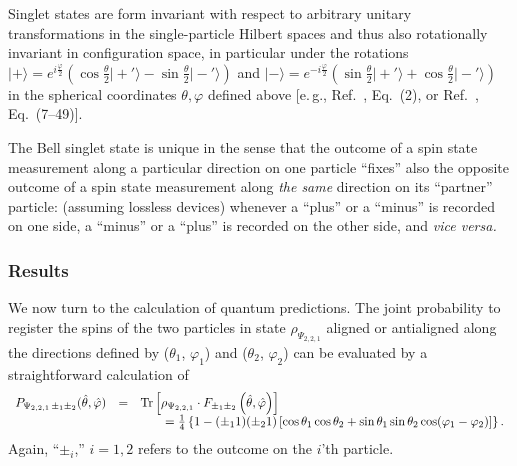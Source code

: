 \documentclass[fleqn,twoside]{article}      %
\begin{document}
Singlet states are form invariant with respect to arbitrary unitary
transformations in the single-particle Hilbert spaces and thus
also rotationally invariant in configuration space,
in particular under the rotations
$
\vert + \rangle =
e^{ i{\frac{\varphi}{2}} }
\left(
\cos \frac{\theta}{2} \vert +'  \rangle
-
\sin \frac{\theta}{2} \vert -'   \rangle
\right)
$
and
$
\vert - \rangle =
e^{ -i{\frac{\varphi}{2}} }
\left(
\sin \frac{\theta}{2} \vert +'   \rangle
+
\cos \frac{\theta}{2} \vert -'  \rangle
\right)
$
in the spherical coordinates $\theta , \varphi$ defined above
[e.\,g., Ref.~\cite{krenn1}, Eq.~(2), or Ref.~\cite{ba-89}, Eq.~(7--49)].

The Bell singlet state is unique in the sense that the outcome of a spin state measurement
along a particular direction on one particle ``fixes'' also the opposite outcome of a spin state measurement
along {\em the same} direction on its ``partner'' particle: (assuming lossless devices)
whenever a ``plus'' or a ``minus'' is recorded on one side,
a ``minus'' or a ``plus'' is recorded on the other side, and {\it vice versa.}




\subsubsection*{Results}

We now turn to the calculation of quantum predictions.
The joint probability to register the spins of the two particles
in state $\rho_{\Psi_{2,2,1}}$
aligned or antialigned along the directions defined by
($\theta_1$, $\varphi_1 $) and
($\theta_2$, $\varphi_2 $)
can be evaluated by a straightforward calculation of
\begin{equation}
\begin{array}{rcl}
P_{{ \Psi_{2,2,1}}\,\pm_1 \pm_2 } ({\hat \theta},{\hat \varphi} )&=&
{\rm Tr}\left[\rho_{ \Psi_{2,2,1}} \cdot F_{\pm_1 \pm_2 } \left({\hat \theta},{\hat \varphi} \right)\right] \\
&&\qquad
=\frac{1}{4} \left\{ 1-(\pm_1 1)( \pm_2 1) \left[\cos \theta_1 \cos \theta_2 + \sin \theta_1 \sin \theta_2 \cos (\varphi_1-\varphi_2) \right]\right\}
.
\end{array}
\end{equation}
Again, ``$\pm_i$,'' $i=1,2$ refers to the outcome on the $i$'th particle.
\end{document}
